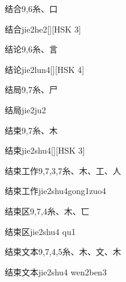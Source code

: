\begin{entry}{结合}{9,6}{⽷、⼝}
  \begin{phonetics}{结合}{jie2he2}[][HSK 3]
  \end{phonetics}
\end{entry}

\begin{entry}{结论}{9,6}{⽷、⾔}
  \begin{phonetics}{结论}{jie2lun4}[][HSK 4]
  \end{phonetics}
\end{entry}

\begin{entry}{结局}{9,7}{⽷、⼫}
  \begin{phonetics}{结局}{jie2ju2}
  \end{phonetics}
\end{entry}

\begin{entry}{结束}{9,7}{⽷、⽊}
  \begin{phonetics}{结束}{jie2shu4}[][HSK 3]
  \end{phonetics}
\end{entry}

\begin{entry}{结束工作}{9,7,3,7}{⽷、⽊、⼯、⼈}
  \begin{phonetics}{结束工作}{jie2shu4gong1zuo4}
  \end{phonetics}
\end{entry}

\begin{entry}{结束区}{9,7,4}{⽷、⽊、⼖}
  \begin{phonetics}{结束区}{jie2shu4 qu1}
  \end{phonetics}
\end{entry}

\begin{entry}{结束文本}{9,7,4,5}{⽷、⽊、⽂、⽊}
  \begin{phonetics}{结束文本}{jie2shu4 wen2ben3}
  \end{phonetics}
\end{entry}

